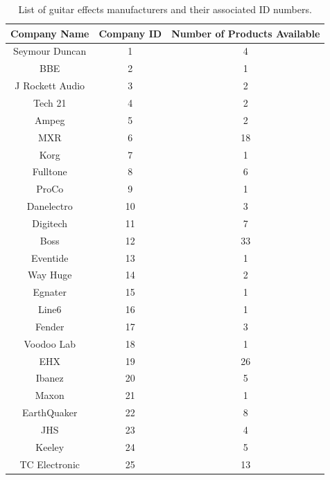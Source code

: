 \documentclass{article}
\begin{document}
	\begin{table}
	\begin{center}
	\begin{tabular}{ |c c c| }
	\hline
	 Company Name & Company ID & Number of Products Available \\ 
	 \hline
	Seymour Duncan    &  1        &  4     \\
    BBE               &  2        &  1     \\
    J Rockett Audio   &  3        &  2     \\
    Tech 21           &  4        &  2     \\
    Ampeg             &  5        &  2     \\
    MXR               &  6        & 18     \\
    Korg              &  7        &  1     \\
    Fulltone          &  8        &  6     \\
    ProCo             &  9        &  1     \\
    Danelectro        & 10        &  3     \\
    Digitech          & 11        &  7     \\
    Boss              & 12        & 33     \\
    Eventide          & 13        &  1     \\
    Way Huge          & 14        &  2     \\
    Egnater           & 15        &  1     \\
    Line6             & 16        &  1     \\
    Fender            & 17        &  3     \\
    Voodoo Lab        & 18        &  1     \\
    EHX               & 19        & 26     \\
    Ibanez            & 20        &  5	   \\    
    Maxon             & 21        &  1     \\
    EarthQuaker       & 22        &  8     \\
    JHS               & 23        &  4     \\
    Keeley            & 24        &  5     \\
    TC Electronic     & 25        & 13     \\
   	\hline
	\end{tabular}
	\caption{List of guitar effects manufacturers and their associated ID numbers.}
	\label{tab:pedal_companies}
	\end{center}
	\end{table}
\end{document}
